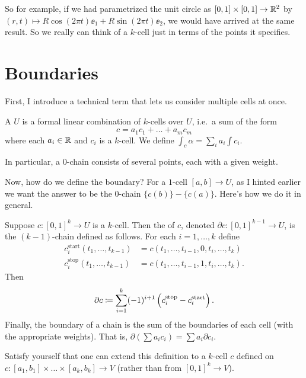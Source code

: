 So for example, if we had parametrized the unit circle as $[0,1] \times [0,1] \to \mathbb R^2$
by $(r,t) \mapsto R\cos(2\pi t) \ee_1 + R\sin(2\pi t) \ee_2$, we would have arrived at the same result.
So we really can think of a $k$-cell just in terms of the points it specifies.

\section{Boundaries}
First, I introduce a technical term that lets us consider multiple cells at once.
\begin{definition}
	A  $U$ is a formal
	linear combination of $k$-cells over $U$,
	i.e.\ a sum of the form
	\[ c = a_1 c_1 + \dots + a_m c_m \]
	where each $a_i \in \mathbb R$ and $c_i$ is a $k$-cell.
	We define $\int_c \alpha = \sum_i a_i \int c_i$.
\end{definition}
In particular, a $0$-chain consists of several points, each with a given weight.

Now, how do we define the boundary?
For a $1$-cell $[a,b] \to U$, as I hinted earlier we want the answer to be the $0$-chain $\{c(b)\}-\{c(a)\}$.
Here's how we do it in general.
\begin{definition}
	Suppose $c : [0,1]^k \to U$ is a $k$-cell.
	Then the  of $c$, denoted $\partial c : [0,1]^{k-1} \to U$,
	is the $(k-1)$-chain defined as follows.
	For each $i = 1,\dots,k$ define
	\begin{align*}
		c_i^{\text{start}}(t_1, \dots, t_{k-1}) &
		= c(t_1, \dots, t_{i-1}, 0, t_i, \dots, t_k) \\
		c_i^{\text{stop}}(t_1, \dots, t_{k-1}) &
		= c(t_1, \dots, t_{i-1}, 1, t_i, \dots, t_k).
	\end{align*}
	Then
	\[ \partial c \coloneqq
	\sum_{i=1}^k (-1)^{i+1} \left( c_i^{\text{stop}} - c_i^{\text{start}}  \right). \]
	Finally, the boundary of a chain is the sum of the boundaries of each cell (with the appropriate weights).
	That is, $\partial(\sum a_ic_i) = \sum a_i \partial c_i$.
\end{definition}
\begin{ques}
	Satisfy yourself that one can extend this definition to
	a $k$-cell $c$ defined on $c : [a_1, b_1] \times \dots \times [a_k, b_k] \to V$
	(rather than from $[0,1]^k \to V$).
\end{ques}

